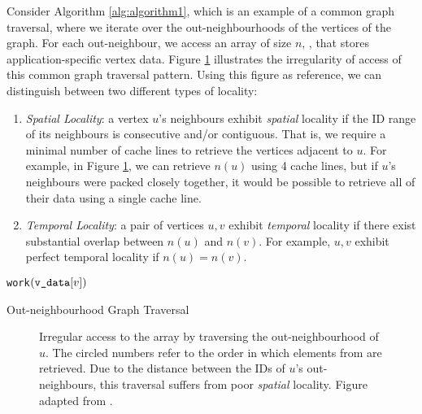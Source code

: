 Consider Algorithm \ref{alg:algorithm1}, which is an example of 
a common graph traversal, where we iterate over the out-neighbourhoods of the vertices of the graph. For each out-neighbour, we access an array of size $n$, \vdata{}, that stores application-specific vertex data.
Figure \ref{fig:irregular_data_access} illustrates the irregularity of access of this common graph traversal pattern.
Using this figure as reference, we can distinguish between two different types of locality:
\begin{enumerate}
    \item \textit{Spatial Locality}: a vertex $u$'s neighbours exhibit \textit{spatial} locality if the ID range of its neighbours is consecutive and/or contiguous. That is, we require a minimal number of cache lines to retrieve the vertices adjacent to $u$. For example, in Figure \ref{fig:irregular_data_access}, we can retrieve $n(u)$ using 4 cache lines, but if $u$'s neighbours were packed closely together, it would be possible to retrieve all of their data using a single cache line.
    \item \textit{Temporal Locality}: a pair of vertices $u, v$ exhibit \textit{temporal} locality if there exist substantial overlap between $n(u)$ and $n(v)$. For example, $u, v$ exhibit perfect temporal locality if $n(u) = n(v)$.
\end{enumerate}
\begin{algorithm}
    \begin{algorithmic}[1]
        \State \texttt{work}$(\texttt{v\_data}{}[v])$
        \EndFor
        \EndFor
    \end{algorithmic}
    \caption{Out-neighbourhood Graph Traversal}
    \label{alg:algorithm1}
\end{algorithm}

\begin{figure}[!htb]
    \begin{adjustwidth}{-0.75in}{-0.75in}
        \centering
        
        \caption{
            Irregular access to the \vdata{} array by traversing the out-neighbourhood of $u$. 
            The circled numbers refer to the order in which elements from \vdata{} are retrieved. 
            Due to the distance between the IDs of $u$'s out-neighbours, this traversal suffers from poor \textit{spatial} locality. Figure adapted from \cite{lwr}.
        }
        \label{fig:irregular_data_access}   %
    \end{adjustwidth}
\end{figure}

